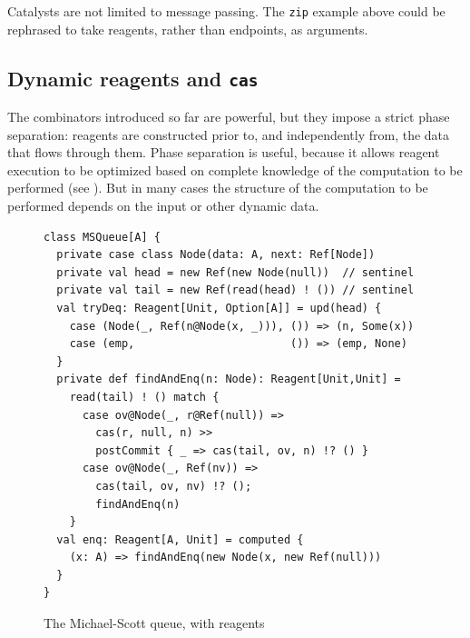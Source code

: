 \documentclass[preprint,nocopyrightspace]{sigplanconf}
\begin{document}
Catalysts are not limited to message passing.  The \lstinline{zip} example
above could be rephrased to take reagents, rather than endpoints, as
arguments.  



\subsection{Dynamic reagents and \lstinline{cas}}
\label{sec:dynamic}

The combinators introduced so far are powerful, but they impose a strict phase
separation: reagents are constructed prior to, and independently from, the
data that flows through them.  Phase separation is useful, because it allows
reagent execution to be optimized based on complete knowledge of the
computation to be performed (see ).  But in many cases
the structure of the computation to be performed depends on the input or other
dynamic data.

\begin{figure}
\begin{lstlisting}[frame=single]
class MSQueue[A] {
  private case class Node(data: A, next: Ref[Node])
  private val head = new Ref(new Node(null))  // sentinel
  private val tail = new Ref(read(head) ! ()) // sentinel
  val tryDeq: Reagent[Unit, Option[A]] = upd(head) {
    case (Node(_, Ref(n@Node(x, _))), ()) => (n, Some(x))
    case (emp,                        ()) => (emp, None)
  }
  private def findAndEnq(n: Node): Reagent[Unit,Unit] = 
    read(tail) ! () match {
      case ov@Node(_, r@Ref(null)) => 
        cas(r, null, n) >>
        postCommit { _ => cas(tail, ov, n) !? () }
      case ov@Node(_, Ref(nv)) => 
        cas(tail, ov, nv) !? (); 
        findAndEnq(n)
    }
  val enq: Reagent[A, Unit] = computed { 
    (x: A) => findAndEnq(new Node(x, new Ref(null)))
  }
}
\end{lstlisting}
\nocaptionrule
\caption{The Michael-Scott queue, with reagents}
\label{fig:msqueue}
\end{figure}
\end{document}
